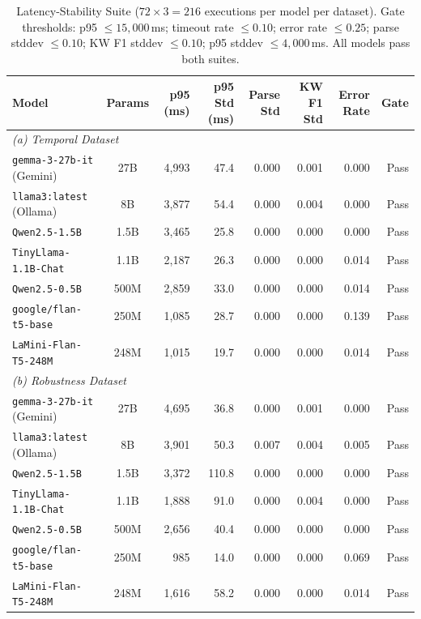 \documentclass[conference]{IEEEtran}
\begin{document}
\begin{table}[t]
    \centering
    \caption{Latency-Stability Suite ($72 \times 3 = 216$ executions per model per dataset). Gate thresholds: p95 $\leq 15{,}000$\,ms; timeout rate $\leq 0.10$; error rate $\leq 0.25$; parse stddev $\leq 0.10$; KW F1 stddev $\leq 0.10$; p95 stddev $\leq 4{,}000$\,ms. All models pass both suites.}
    \begin{tabular}{lcrrrrrr}
        \toprule
        \textbf{Model} & \textbf{Params} & \textbf{p95 (ms)} & \textbf{p95 Std (ms)} & \textbf{Parse Std} & \textbf{KW F1 Std} & \textbf{Error Rate} & \textbf{Gate} \\
        \midrule
        \multicolumn{8}{l}{\textit{(a) Temporal Dataset}} \\
        \midrule
        \texttt{gemma-3-27b-it} (Gemini)    & 27B   & 4{,}993 & 47.4  & 0.000 & 0.001 & 0.000 & Pass \\
        \texttt{llama3:latest} (Ollama)     & 8B    & 3{,}877 & 54.4  & 0.000 & 0.004 & 0.000 & Pass \\
        \texttt{Qwen2.5-1.5B}               & 1.5B  & 3{,}465 & 25.8  & 0.000 & 0.000 & 0.000 & Pass \\
        \texttt{TinyLlama-1.1B-Chat}        & 1.1B  & 2{,}187 & 26.3  & 0.000 & 0.000 & 0.014 & Pass \\
        \texttt{Qwen2.5-0.5B}               & 500M  & 2{,}859 & 33.0  & 0.000 & 0.000 & 0.014 & Pass \\
        \texttt{google/flan-t5-base}        & 250M  & 1{,}085 & 28.7  & 0.000 & 0.000 & 0.139 & Pass \\
        \texttt{LaMini-Flan-T5-248M}        & 248M  & 1{,}015 & 19.7  & 0.000 & 0.000 & 0.014 & Pass \\
        \midrule
        \multicolumn{8}{l}{\textit{(b) Robustness Dataset}} \\
        \midrule
        \texttt{gemma-3-27b-it} (Gemini)    & 27B   & 4{,}695 & 36.8  & 0.000 & 0.001 & 0.000 & Pass \\
        \texttt{llama3:latest} (Ollama)     & 8B    & 3{,}901 & 50.3  & 0.007 & 0.004 & 0.005 & Pass \\
        \texttt{Qwen2.5-1.5B}               & 1.5B  & 3{,}372 & 110.8 & 0.000 & 0.000 & 0.000 & Pass \\
        \texttt{TinyLlama-1.1B-Chat}        & 1.1B  & 1{,}888 & 91.0  & 0.000 & 0.004 & 0.000 & Pass \\
        \texttt{Qwen2.5-0.5B}               & 500M  & 2{,}656 & 40.4  & 0.000 & 0.000 & 0.000 & Pass \\
        \texttt{google/flan-t5-base}        & 250M  & 985     & 14.0  & 0.000 & 0.000 & 0.069 & Pass \\
        \texttt{LaMini-Flan-T5-248M}        & 248M  & 1{,}616 & 58.2  & 0.000 & 0.000 & 0.014 & Pass \\
        \bottomrule
    \end{tabular}
    \label{table:latency_stability}
\end{table}
\end{document}
